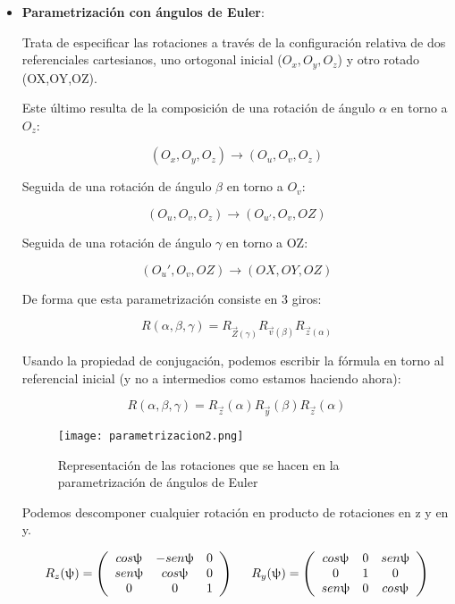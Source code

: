 \documentclass{article}
\begin{document}
        \begin{itemize}
            \item \textbf{Parametrización con ángulos de Euler}:

            Trata de especificar las rotaciones a través de la configuración relativa de dos referenciales cartesianos, uno ortogonal inicial ($O_x,O_y,O_z$) y otro rotado (OX,OY,OZ).

            Este último resulta de la composición de una rotación de ángulo $\alpha$ en torno a $O_z$:

            $$ (O_x,O_y,O_z) \longrightarrow (O_u,O_v,O_z)$$

            Seguida de una rotación de ángulo $\beta$ en torno a $O_v$:

            $$(O_u,O_v,O_z) \longrightarrow (O_{u'},O_v,OZ)$$

            Seguida de una rotación de ángulo $\gamma$ en torno a OZ:

            $$(O_u',O_v,OZ) \longrightarrow (OX,OY,OZ)$$

            De forma que esta parametrización consiste en 3 giros:

            $$R(\alpha, \beta , \gamma)=R_{\Vec{Z}(\gamma)}R_{\Vec{v}(\beta)}R_{\Vec{z}(\alpha)}$$

            Usando la propiedad de conjugación, podemos escribir la fórmula en torno al referencial inicial (y no a intermedios como estamos haciendo ahora):

            $$R(\alpha, \beta , \gamma)=R_{\Vec{z}}(\alpha)R_{\Vec{y}}(\beta)R_{\Vec{z}}(\alpha)$$

            \begin{figure}[h!]
                \centering
             \texttt{[image: parametrizacion2.png]}
                \caption{Representación de las rotaciones que se hacen en la parametrización de ángulos de Euler}
                \label{fig:my_label}
            \end{figure}

            \newpage
            Podemos descomponer cualquier rotación en producto de rotaciones en z y en y.

            $$R_{z}(\uppsi )=\left ( \begin{array}{ccc}
                 cos \uppsi & -sen \uppsi  & 0 \\
                 sen \uppsi & cos \uppsi & 0 \\
                 0 & 0 & 1
            \end{array}\right) \hspace{0.5cm} R_{y}(\uppsi )=\left ( \begin{array}{ccc}
                 cos \uppsi & 0 & sen \uppsi \\
                 0 & 1 & 0 \\
                 sen \uppsi & 0 & cos \uppsi
            \end{array}\right)$$
        \end{itemize}
\end{document}
